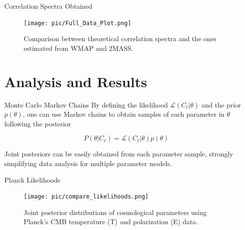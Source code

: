 \documentclass[serif, aspectratio=169]{beamer}
\begin{document}
\begin{frame}{Correlation Spectra Obtained}
    \begin{figure}
        \centering
        \texttt{[image: pic/Full\_Data\_Plot.png]}
        \caption{Comparison between theoretical correlation spectra and the ones estimated from WMAP and 2MASS.}
        \label{fig:correlations_obtained}
    \end{figure}
\end{frame}

\section{Analysis and Results}

\begin{frame}{Monte Carlo Markov Chains}
	By defining the likelihood $\mathcal{L}(C_\ell|\theta)$ and the prior $p(\theta)$, one can use Markov chains to obtain samples of each parameter in $\theta$ following the posterior
	
	\begin{equation}
		P(\theta|C_\ell)=\mathcal{L}(C_\ell|\theta)p(\theta)
	\end{equation}
	
	Joint posteriors can be easily obtained from each parameter sample, strongly simplifying data analysis for multiple parameter models.
\end{frame}

\begin{frame}{Planck Likelihoods}
	\begin{figure}
	\centering
	\texttt{[image: pic/compare\_likelihoods.png]}
	\caption{Joint posterior distributions of cosmological parameters using Planck’s CMB temperature (T) and polarization (E) data.}
	\label{fig:Planck_posteriors}
	\end{figure}
\end{frame}
\end{document}
